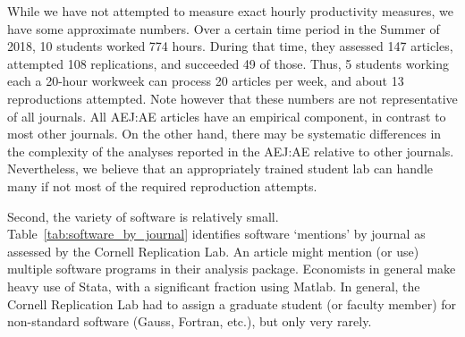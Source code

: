 \documentclass[PP]{AEA}
\begin{document}
While we have not attempted to measure exact hourly productivity measures, we have some approximate numbers. Over a certain time period in the Summer of 2018, 10 students worked 774 hours. During that time, they assessed 147 articles, attempted 108 replications, and succeeded 49 of those. Thus, 5 students working each a 20-hour workweek can process 20 articles per week, and about 13 reproductions attempted. Note however that these numbers are not representative of all journals. All AEJ:AE articles have an empirical component, in contrast to most other journals. On the other hand, there may be systematic differences in the complexity of the analyses reported in the AEJ:AE relative to other journals. Nevertheless, we believe that an appropriately trained student lab can handle many if not most of the required reproduction attempts.

Second, the variety of software is relatively small. %
Table~\ref{tab:software_by_journal} identifies software `mentions' by journal as assessed by the Cornell Replication Lab. An article might mention (or use) multiple software programs in their analysis package.  Economists in general make heavy use of Stata, with a significant fraction using Matlab. In general, the Cornell Replication Lab had to assign a graduate student (or faculty member) for non-standard software (Gauss, Fortran, etc.), but only very rarely.

%
\end{document}
